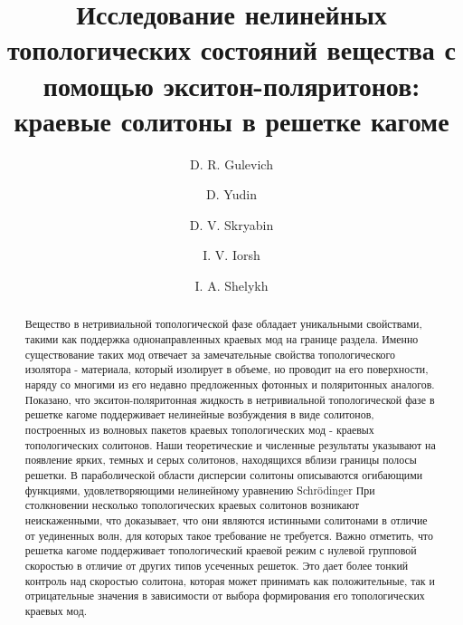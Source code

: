 \documentclass[
aps,
prl,
groupedaddress,
superscriptaddress,
floatfix,
notitlepage
]{revtex4-1}
\begin{document}
\title{Исследование нелинейных топологических состояний вещества с помощью экситон-поляритонов: краевые солитоны в решетке кагоме}

\author{D. R. Gulevich} 

\author{D. Yudin} 

\author{D. V. Skryabin} 

\author{I. V. Iorsh} 

\author{I. A. Shelykh} 


\begin{abstract}
Вещество в нетривиальной топологической фазе обладает уникальными свойствами, такими как поддержка однонаправленных краевых мод на границе раздела. Именно существование таких мод отвечает за замечательные свойства топологического изолятора - материала, который изолирует в объеме, но проводит на его поверхности, наряду со многими из его недавно предложенных фотонных и поляритонных аналогов. Показано, что экситон-поляритонная жидкость в нетривиальной топологической фазе в решетке кагоме поддерживает нелинейные возбуждения в виде солитонов, построенных из волновых пакетов краевых топологических мод - краевых топологических солитонов. Наши теоретические и численные результаты указывают на появление ярких, темных и серых солитонов, находящихся вблизи границы полосы решетки. В параболической области дисперсии солитоны описываются огибающими функциями, удовлетворяющими нелинейному уравнению Schr\"odinger 
При столкновении несколько топологических краевых солитонов возникают неискаженными, что доказывает, что они являются истинными солитонами в отличие от уединенных волн, для которых такое требование не требуется. Важно отметить, что решетка кагоме поддерживает топологический краевой режим с нулевой групповой скоростью в отличие от других типов усеченных решеток. Это дает более тонкий контроль над скоростью солитона, которая может принимать как положительные, так и отрицательные значения в зависимости от выбора формирования его топологических краевых мод.
\end{abstract}
\end{document}
